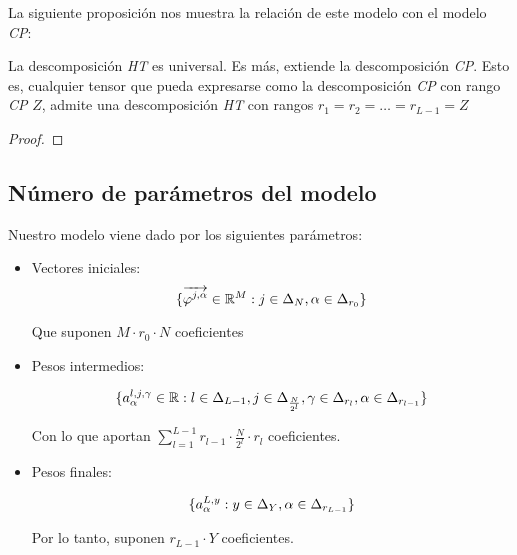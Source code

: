 La siguiente proposición nos muestra la relación de este modelo con el modelo \textit{CP}:

\begin{proposicion}
    La descomposición \textit{HT} es universal. Es más, extiende la descomposición \textit{CP}. Esto es, cualquier tensor que pueda expresarse como la descomposición \textit{CP} con rango \textit{CP} $Z$, admite una descomposición \textit{HT} con rangos $r_1 = r_2 = \ldots = r_{L - 1} = Z$
\end{proposicion}

\begin{proof}
\end{proof}

\subsection{Número de parámetros del modelo} \label{msubs:parametros_modelo_ht}

Nuestro modelo viene dado por los siguientes parámetros:

\begin{itemize}
    \item Vectores iniciales:
        \begin{equation}
            \{\overrightarrow{\varphi^{j, \alpha}} \in \mathbb{R}^M: j \in \Delta_{N}, \alpha \in \Delta_{r_0}  \}
        \end{equation}

        Que suponen $M \cdot r_0 \cdot N$ coeficientes
    \item Pesos intermedios:

        \begin{equation}
            \{ a^{l, j, \gamma}_{\alpha} \in \mathbb{R}: l \in \Delta_{L-1}, j \in \Delta_{\frac{N}{2^l}}, \gamma \in \Delta_{r_l}, \alpha \in \Delta_{r_{l-1}} \}
        \end{equation}

        Con lo que aportan $\sum_{l = 1}^{L-1} r_{l-1} \cdot \frac{N}{2^l} \cdot r_l$ coeficientes.

    \item Pesos finales:

        \begin{equation}
            \{a^{L, y}_{\alpha}: y \in \Delta_{Y}, \alpha \in \Delta_{r_{L-1}} \}
        \end{equation}

        Por lo tanto, suponen $r_{L-1} \cdot Y$ coeficientes.
\end{itemize}


